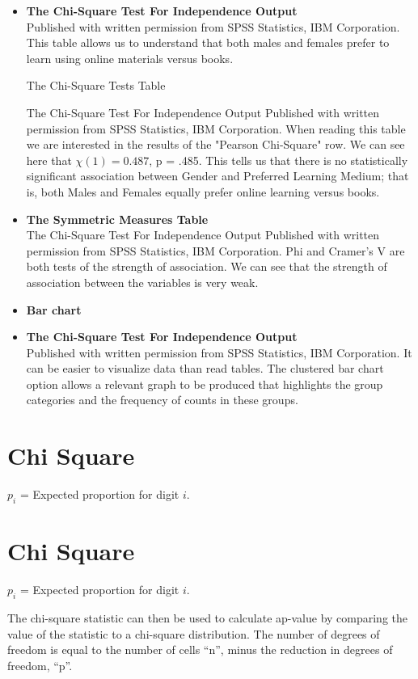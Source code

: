 \documentclass[00-IntroStatsMaster.tex]{subfiles}
\begin{document}
\begin{itemize}
\item \textbf{The Chi-Square Test For Independence Output}\\
Published with written permission from SPSS Statistics, IBM Corporation.
This table allows us to understand that both males and females prefer to learn using online materials versus books.

The Chi-Square Tests Table

The Chi-Square Test For Independence Output
Published with written permission from SPSS Statistics, IBM Corporation.
When reading this table we are interested in the results of the "Pearson Chi-Square" row. We can see here that $\chi(1) = 0.487$, p = .485. This tells us that there is no statistically significant association between Gender and Preferred Learning Medium; that is, both Males and Females equally prefer online learning versus books.

\item \textbf{The Symmetric Measures Table}\\

The Chi-Square Test For Independence Output
Published with written permission from SPSS Statistics, IBM Corporation.
Phi and Cramer's V are both tests of the strength of association. We can see that the strength of association between the variables is very weak.

\item \textbf{Bar chart}\\

\item \textbf{The Chi-Square Test For Independence Output}\\
Published with written permission from SPSS Statistics, IBM Corporation.
It can be easier to visualize data than read tables. The clustered bar chart option allows a relevant graph to be produced that highlights the group categories and the frequency of counts in these groups.
\end{itemize}
\section{Chi Square}


$p_{i}$ = Expected proportion for digit $i$.


\section{Chi Square}


$p_{i}$ = Expected proportion for digit $i$.



The chi-square statistic can then be used to calculate ap-value by comparing the value of the statistic to a chi-square distribution. The number of degrees of freedom is equal to the number of cells ``n'', minus the reduction in degrees of freedom, ``p''.
\end{document}
